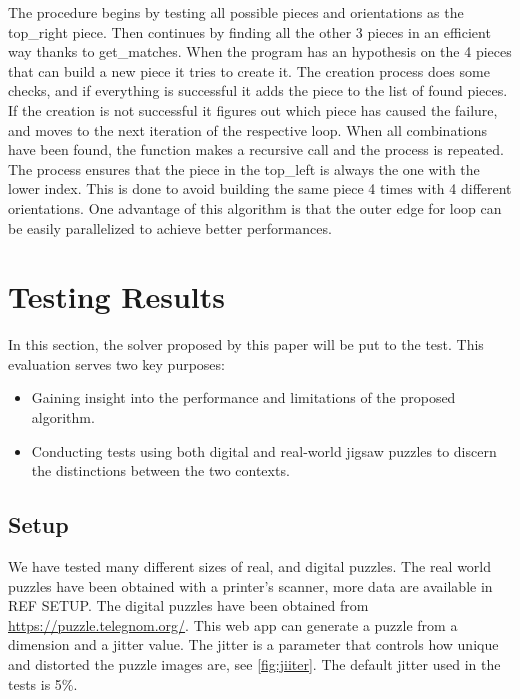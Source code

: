 \documentclass{article}
\begin{document}
The procedure begins by testing all possible pieces and orientations as the top\_right piece.
Then continues by finding all the other 3 pieces in an efficient way thanks to get\_matches.
When the program has an hypothesis on the 4 pieces that can build a new piece it tries to create it.\newline
The creation process does some checks, and if everything is successful it adds the piece to the list of found pieces.
If the creation is not successful it figures out which piece has caused the failure, and moves to the next iteration of the respective loop.\newline
When all combinations have been found, the function makes a recursive call and the process is repeated.\newline
The process ensures that the piece in the top\_left is always the one with the lower index.
This is done to avoid building the same piece 4 times with 4 different orientations.\newline
One advantage of this algorithm is that the outer edge for loop can be easily parallelized to achieve better performances.

\section{Testing Results}

In this section, the solver proposed by this paper will be put to the test.
This evaluation serves two key purposes:

\begin{itemize}
  \item Gaining insight into the performance and limitations of the proposed algorithm.
  \item Conducting tests using both digital and real-world jigsaw puzzles to discern the distinctions between the two contexts.
\end{itemize}

\subsection{Setup}
We have tested many different sizes of real, and digital puzzles.
The real world puzzles have been obtained with a printer’s scanner, more data are available in REF SETUP.
The digital puzzles have been obtained from \url{https://puzzle.telegnom.org/}.
This web app can generate a puzzle from a dimension and a jitter value. The jitter is a parameter that controls
how unique and distorted the puzzle images are, see \cref{fig:jiiter}.
The default jitter used in the tests is 5\%.
\end{document}

